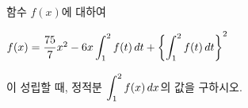 함수 $f(x)$에 대하여 \par\smallskip\noindent\hspace*{1.5em}$f(x)=\dfrac{75}{7}x^2-6x\displaystyle\int_{1}^{2}f(t)\mkern3mu dt+\left\{\int_{1}^{2}f(t)\mkern3mu dt\right\}^2$\par\smallskip\noindent 이 성립할 때, 정적분 $\displaystyle\int_{1}^{2}f(x)\mkern3mu dx$의 값을 구하시오.

